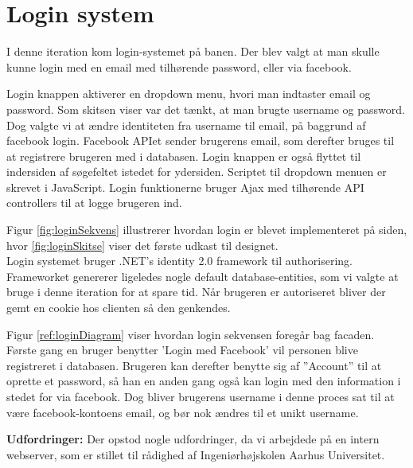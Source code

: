 \chapter{Login system}

I denne iteration kom login-systemet på banen. Der blev valgt at man skulle kunne login med en email med tilhørende password, eller via facebook.


Login knappen aktiverer en dropdown menu, hvori man indtaster email og password. Som skitsen viser var det tænkt, at man brugte username og password. Dog valgte vi at ændre identiteten fra username til email, på baggrund af facebook login. Facebook APIet sender brugerens email, som derefter bruges til at registrere brugeren med i databasen. Login knappen er også flyttet til indersiden af søgefeltet istedet for ydersiden. Scriptet til dropdown menuen er skrevet i JavaScript. Login funktionerne bruger Ajax med tilhørende API controllers til at logge brugeren ind.


Figur \ref{fig:loginSekvens} illustrerer hvordan login er blevet implementeret på siden, hvor \ref{fig:loginSkitse} viser det første udkast til designet. \\

Login systemet bruger .NET's identity 2.0 framework til authorisering. Frameworket genererer ligeledes nogle default database-entities, som vi valgte at bruge i denne iteration for at spare tid. Når brugeren er autoriseret bliver der gemt en cookie hos clienten så den genkendes.



Figur \ref{ref:loginDiagram} viser hvordan login sekvensen foregår bag facaden. Første gang en bruger benytter 'Login med Facebook' vil personen blive registreret i databasen. Brugeren kan derefter benytte sig af ''Account'' til at oprette et password, så han en anden gang også kan login med den information i stedet for via facebook. Dog bliver brugerens username i denne proces sat til at være facebook-kontoens email, og bør nok ændres til et unikt username.

\textbf{Udfordringer:} 
Der opstod nogle udfordringer, da vi arbejdede på en intern webserver, som er stillet til rådighed af Ingeniørhøjskolen Aarhus Universitet. 

